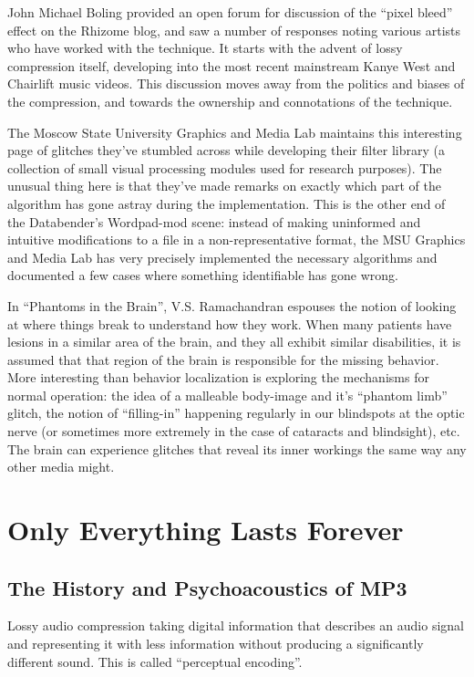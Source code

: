 \documentclass{thesis}
\begin{document}
	\cite{john_michael_boling_rhizome_????}
	John Michael Boling provided an open forum for discussion of the ``pixel bleed'' effect on the Rhizome blog, and saw a number of responses noting various artists who have worked with the technique. It starts with the advent of lossy compression itself, developing into the most recent mainstream Kanye West and Chairlift music videos. This discussion moves away from the politics and biases of the compression, and towards the ownership and connotations of the technique.
	
	\cite{nikolai_trunichkin_and_dr._dmitriy_vatolin_crazy_????}
	The Moscow State University Graphics and Media Lab maintains this interesting page of glitches they've stumbled across while developing their filter library (a collection of small visual processing modules used for research purposes). The unusual thing here is that they've made remarks on exactly which part of the algorithm has gone astray during the implementation. This is the other end of the Databender's Wordpad-mod scene: instead of making uninformed and intuitive modifications to a file in a non-representative format, the MSU Graphics and Media Lab has very precisely implemented the necessary algorithms and documented a few cases where something identifiable has gone wrong.
	
	\cite{ramachandran_phantoms_1999}
	In ``Phantoms in the Brain'', V.S. Ramachandran espouses the notion of looking at where things break to understand how they work. When many patients have lesions in a similar area of the brain, and they all exhibit similar disabilities, it is assumed that that region of the brain is responsible for the missing behavior. More interesting than behavior localization is exploring the mechanisms for normal operation: the idea of a malleable body-image and it's ``phantom limb'' glitch, the notion of ``filling-in'' happening regularly in our blindspots at the optic nerve (or sometimes more extremely in the case of cataracts and blindsight), etc. The brain can experience glitches that reveal its inner workings the same way any other media might.
	
\chapter{Only Everything Lasts Forever}
\section{The History and Psychoacoustics of MP3}
Lossy audio compression taking digital information that describes an audio signal and representing it with less information without producing a significantly different sound. This is called ``perceptual encoding''.\cite{Ruckert05}
\end{document}
